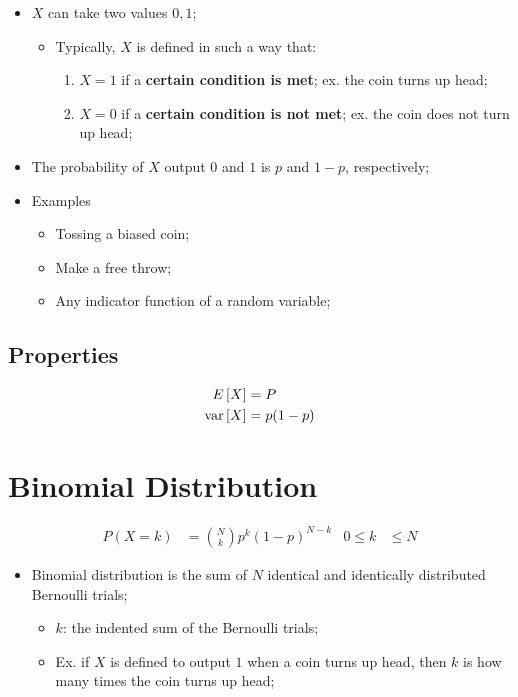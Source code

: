   \begin{itemize}
    \item $ X $ can take two values $ 0, 1 $;
    \begin{itemize}
      \item Typically, $ X $ is defined in such a way that:
      \begin{enumerate}
        \item $ X = 1 $ if a \textbf{certain condition is met}; ex. the coin turns up head;
        \item $ X = 0 $ if a \textbf{certain condition is not met}; ex. the coin does not turn up head;
      \end{enumerate}
    \end{itemize}

    \item The probability of $ X $ output $ 0 $ and $ 1 $ is $ p $ and $ 1 - p $, respectively;
    \item Examples
    \begin{itemize}
      \item Tossing a biased coin;
      \item Make a free throw;
      \item Any indicator function of a random variable;
    \end{itemize}
  \end{itemize}
  
  \subsection{Properties}
  
    \begin{align}
      E \left[ X \right] &= P \\
      \operatorname{var} \left[ X \right] &= p (1 - p)
    \end{align}
    
\section{Binomial Distribution}

  \begin{align}
    P (X = k) &= {N \choose k}p^{k} (1 - p)^{N - k} & 0 \le k &\le N
  \end{align}
  
  \begin{itemize}
    \item Binomial distribution is the sum of $ N $ identical and identically distributed Bernoulli trials;
    \begin{itemize}
      \item $ k $: the indented sum of the Bernoulli trials;
      \item Ex. if $ X $ is defined to output $ 1 $ when a coin turns up head, then $ k $ is how many times the coin turns up head;
    \end{itemize}
  \end{itemize}
  
